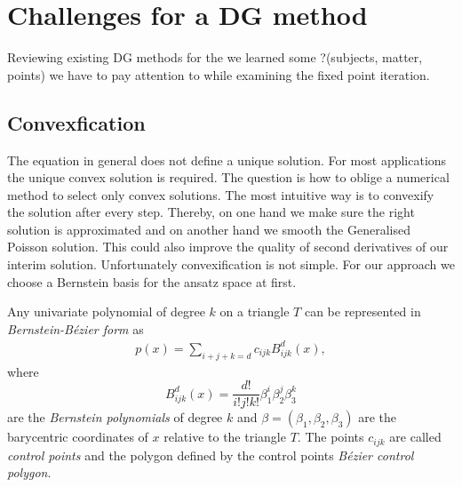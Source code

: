 \section{Challenges for a \MA DG method}
Reviewing existing DG methods for the \MA we learned some ?(subjects, matter, points) we have to pay attention to  while examining the fixed point iteration.

\subsection{Convexfication} \label{subsec: convexification}
The \MA equation in general does not define a unique solution. For most applications the unique convex solution is required. The question is how to oblige a numerical method to select only convex solutions.
The most intuitive way is to convexify the solution after every step. Thereby, on one hand we make sure the right solution is approximated and on another hand we smooth the Generalised Poisson solution. This could also improve the quality of second derivatives of our interim solution. %
Unfortunately convexification is not simple. For our approach we choose a Bernstein basis for the ansatz space at first.
\begin{definition}\label{def: BernsteinBezierForm}
	Any univariate polynomial of degree $k$ on a triangle $T$ can be represented in \emph{Bernstein-B\'ezier form} as
\begin{align}
	p(x) = \sum_{i+j+k = d}  c_{ijk} B^d_{ijk}(x),\label{eq: BernsteinBezierForm}
\end{align}
where
\[
	B^d_{ijk}(x) = \frac {d!}{i!j!k!} \beta_1^i \beta_2^j \beta_3^k
\]
are the \emph{Bernstein polynomials} of degree $k$ and $\beta = (\beta_1, \beta_2, \beta_3)$ are the barycentric coordinates of $x$ relative to the triangle $T$.
The points $c_{ijk}$ are called \emph{control points} and the polygon defined by the control points \emph{B\'ezier control polygon}.
\end{definition}

